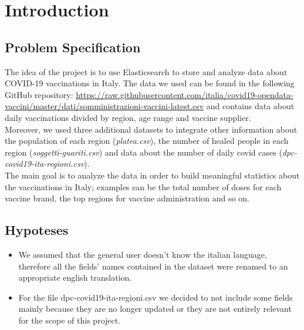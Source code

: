 \documentclass[12pt, a4paper]{article}
\begin{document}
\clearpage

\setlength{\parskip}{\baselineskip}%
\setlength{\parindent}{0pt}%

\section{Introduction}

\subsection{Problem Specification}

The idea of the project is to use Elasticsearch to store and analyze data about 
COVID-19 vaccinations in Italy. The data we used can be found in the following 
GitHub repository: \url{https://raw.githubusercontent.com/italia/covid19-opendata-vaccini/master/dati/somministrazioni-vaccini-latest.csv}
and contains data about daily vaccinations divided by region, age range and vaccine
supplier. \\ Moreover, we used three additional datasets to integrate other information 
about the population of each region (\emph{platea.csv}), the number of healed people in each region (\emph{soggetti-guariti.csv}) and data about the number of daily covid cases (\emph{dpc-covid19-ita-regioni.csv}). \\
The main goal is to analyze the data in order to build meaningful statistics 
about the vaccinations in Italy; examples can be the total number of doses for each 
vaccine brand, the top regions for vaccine administration and so on.

\subsection{Hypoteses}

\begin{itemize}
  \item[] We assumed that the general user doesn't know the italian language, therefore
    all the fields' names contained in the dataset were renamed to an appropriate 
    english translation. 
  \item[] For the file dpc-covid19-ita-regioni.csv we decided to not include some fields
    mainly because they are no longer updated or they are not entirely relevant for the
    scope of this project.
\end{itemize}
  
\clearpage
\end{document}
